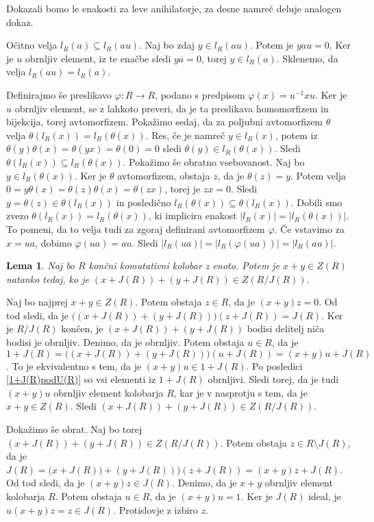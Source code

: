 \documentclass[a4paper, 12pt]{amsart}
\theoremstyle{definition} %
\theoremstyle{plain} %
\newtheorem{lema}[definicija]{Lema}
\begin{document}
\proof
Dokazali bomo le enakosti za leve anihilatorje, za desne namreč deluje analogen dokaz. 

Očitno velja $l_R(a) \subseteq l_R(au)$. Naj bo zdaj $y\in l_R(au)$. Potem je $yau=0$. Ker je $u$ obrnljiv element, iz te enačbe sledi $ya = 0$, torej $y\in l_R(a)$. Sklenemo, da velja $l_R(au) = l_R(a)$.

Definirajmo še preslikavo $\varphi : R \rightarrow R$, podano s predpisom $\varphi(x) = u^{-1}xu$. Ker je $u$ obrnljiv element, se z lahkoto preveri, da je ta preslikava homomorfizem in bijekcija, torej avtomorfizem. Pokažimo sedaj, da za poljubni avtomorfizem $\theta$ velja $\theta(l_R(x)) = l_R(\theta(x))$. Res, če je namreč $y\in l_R(x)$, potem iz $\theta(y) \theta(x) = \theta(yx) = \theta(0) = 0$ sledi $\theta(y) \in l_R(\theta(x))$. Sledi $\theta(l_R(x)) \subseteq l_R(\theta(x))$. Pokažimo še obratno vsebovanost. Naj bo $y\in l_R(\theta(x))$. Ker je $\theta$ avtomorfizem, obstaja $z$, da je $\theta(z) = y$. Potem velja $0 = y\theta(x) = \theta(z) \theta(x)= \theta(zx)$, torej je $zx=0$. Sledi $y=\theta(z) \in \theta(l_R(x))$ in posledično $l_R(\theta(x)) \subseteq \theta(l_R(x))$. Dobili smo zvezo $\theta(l_R(x)) = l_R(\theta(x))$, ki implicira enakost $|l_R(x)| = |l_R(\theta(x))|$. To pomeni, da to velja tudi za zgoraj definirani avtomorfizem $\varphi$. Če vstavimo za $x= ua$, dobimo $\varphi(ua) = au$. Sledi $|l_R(ua)| =|l_R(\varphi(ua))| = |l_R(au)|$.
\endproof

\begin{lema}
\label{vsotaElementovDeliteljNica}
Naj bo $R$ končni komutativni kolobar z enoto. Potem je $x+y \in Z(R)$ natanko tedaj, ko je $(x+ J(R)) + (y+J(R)) \in Z(R/J(R))$.
\end{lema}

\proof
Naj bo najprej $x+y\in Z(R)$. Potem obstaja $z\in R$, da je $(x+y)z = 0$. Od tod sledi, da je $\big( ( x + J(R)) + (y+J(R))\big) (z+J(R)) = J(R)$. Ker je $R/J(R)$ končen, je  $( x + J(R)) + (y+J(R))$ bodisi delitelj niča bodisi je obrnljiv. Denimo, da je obrnljiv. Potem obstaja $u\in R$, da je $1+J(R) = \big( (x+J(R)) + (y+J(R)) \big) (u+J(R)) = (x+y)u + J(R)$. To je ekvivalentno s tem, da je $(x+y)u \in 1 + J(R)$. Po posledici \ref{1+J(R)podU(R)} so vsi elementi iz $1+J(R)$ obrnljivi. Sledi torej, da je tudi $(x+y)u$ obrnljiv element kolobarja $R$, kar je v nasprotju s tem, da je $x+y\in Z(R)$. Sledi $( x + J(R)) + (y+J(R)) \in Z(R/J(R))$.

Dokažimo še obrat. Naj bo torej $( x + J(R)) + (y+J(R)) \in Z(R/J(R))$. Potem obstaja $z\in R\setminus J(R)$, da je $J(R) = \big ( x + J(R)) + (y+J(R)) \big) (z+J(R)) = (x+y)z +J(R)$. Od tod sledi, da je $(x+y)z\in J(R)$. Denimo, da je $x+y$ obrnljiv element kolobarja $R$. Potem obstaja $u\in R$, da je $(x+y)u = 1$. Ker je $J(R)$ ideal, je $u(x+y) z = z\in J(R)$. Protislovje z izbiro $z$.
\endproof
\end{document}
